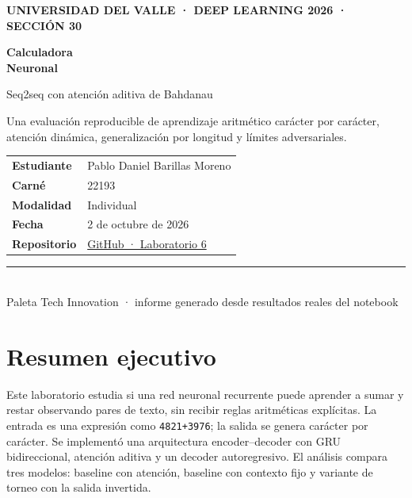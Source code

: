 \documentclass[11pt,letterpaper]{article}
\newcommand{\code}[1]{\texttt{#1}}
\begin{document}
\begin{titlepage}
\pagecolor{DarkGray}\color{white}
\vspace*{1.5cm}
{\small\bfseries\color{NeonCyan} UNIVERSIDAD DEL VALLE · DEEP LEARNING 2026 · SECCIÓN 30\par}
\vspace{1.2cm}
{\fontsize{36}{42}\selectfont\bfseries Calculadora\\Neuronal\par}
\vspace{.45cm}
{\Large Seq2seq con atención aditiva de Bahdanau\par}
\vspace{1cm}
\colorbox{ElectricBlue}{\parbox{0.87\textwidth}{\color{white}\large
Una evaluación reproducible de aprendizaje aritmético carácter por carácter, atención dinámica,
generalización por longitud y límites adversariales.}}
\vfill
\begin{tabularx}{\textwidth}{@{}lX@{}}
\textcolor{NeonCyan}{\bfseries Estudiante} & Pablo Daniel Barillas Moreno \\
\textcolor{NeonCyan}{\bfseries Carné} & 22193 \\
\textcolor{NeonCyan}{\bfseries Modalidad} & Individual \\
\textcolor{NeonCyan}{\bfseries Fecha} & 2 de octubre de 2026 \\
\textcolor{NeonCyan}{\bfseries Repositorio} & \href{https://github.com/DanielBarillasM/Laboratorio-6_Daniel-Barillas_22193_DLYSI_Sec-30}{GitHub · Laboratorio 6}
\end{tabularx}
\vspace{1cm}
{\color{MidBlue}\rule{\textwidth}{1pt}}\\[5pt]
{\small Paleta Tech Innovation · informe generado desde resultados reales del notebook}
\end{titlepage}
\nopagecolor\color{DarkGray}

\tableofcontents
\clearpage

\section{Resumen ejecutivo}

Este laboratorio estudia si una red neuronal recurrente puede aprender a sumar y restar observando pares
de texto, sin recibir reglas aritméticas explícitas. La entrada es una expresión como
\code{4821+3976}; la salida se genera carácter por carácter. Se implementó una arquitectura encoder--decoder
con GRU bidireccional, atención aditiva y un decoder autoregresivo. El análisis compara tres modelos:
baseline con atención, baseline con contexto fijo y variante de torneo con la salida invertida.
\end{document}
